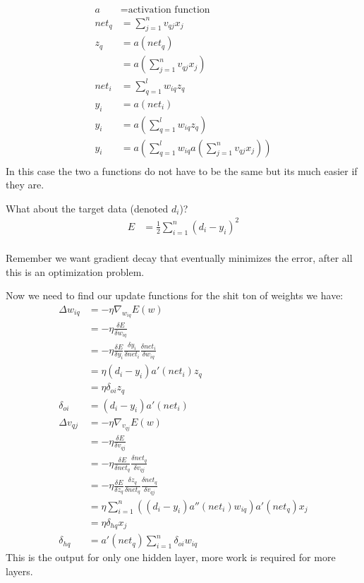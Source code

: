 \documentclass{article}
\begin{document}
\begin{align*}
	a &= \text{activation function}\\
	net_q &= \sum_{j=1}^n v_{qj}x_j\\
	z_q &= a(net_q)\\
	&= a(\sum_{j=1}^n v_{qj}x_j)\\
	net_i &= \sum_{q=1}^l w_{iq}z_q\\
	y_i&= a(net_i)\\
	y_i &= a(\sum_{q=1}^l w_{iq}z_q)\\
	y_i &= a(\sum_{q=1}^l w_{iq}a(\sum_{j=1}^n v_{qj}x_j))\\
\end{align*}
In this case the two a functions do not have to be the same but its much easier if they are.

What about the target data (denoted $d_i$)?
\begin{align*}
	E &= \frac{1}{2}\sum_{i=1}^n(d_i - y_i)^2\\
\end{align*}

Remember we want gradient decay that eventually minimizes the error, after all this is an optimization problem.

Now we need to find our update functions for the shit ton of weights we have:
\begin{align*}
	\Delta w_{iq} &= -\eta\nabla_{w_{iq}} E(w)\\
	&= -\eta\frac{\delta E}{\delta w_{iq}}\\
	&= -\eta\frac{\delta E}{\delta y_{i}}\frac{\delta y_i}{\delta net_i} \frac{\delta net_i}{\delta w_{iq}}\\
	&= \eta(d_i - y_i)a'(net_i) z_q\\
	&= \eta\delta_{oi}z_q\\
	\delta_{oi}&= (d_i - y_i)a'(net_i)\\
	\Delta v_{qj} &= -\eta\nabla_{v_{qj}} E(w)\\
	&= -\eta\frac{\delta E}{\delta v_{qj}}\\
	&= -\eta\frac{\delta E}{\delta net_q}\frac{\delta net_q}{\delta v_{qj}}\\
	&= -\eta\frac{\delta E}{\delta z_q}\frac{\delta z_q}{\delta net_q}\frac{\delta net_q}{\delta v_{qj}}\\
	&= \eta\sum_{i=1}^{n}\left ((d_i - y_i)a''(net_i)w_{iq} \right )a'(net_q)x_j\\
	&= \eta \delta_{hq}x_j\\
	\delta_{hq} &= a'(net_q) \sum_{i=1}^n \delta_{oi}w_{iq}
\end{align*}
This is the output for only one hidden layer, more work is required for more layers.
\end{document}
